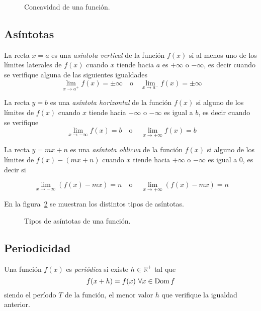 \begin{figure}[h!]
\centering {}\qquad
{}
\caption{Concavidad de una función.}
\label{g:concavidad}
\end{figure}

\subsection{Asíntotas}

La recta $x=a$ es una \emph{asíntota vertical} de la función $f(x)$ si al menos uno de los límites laterales de $f(x)$ cuando $x$ tiende hacia $a$ es $+\infty$ o $-\infty$, es decir cuando se verifique alguna de las siguientes igualdades
\[
\ \lim_{x\rightarrow a^{+}}f(x)=\pm\infty   \quad \textrm{o} \quad
\lim_{x\rightarrow a^{-}}f(x)=\pm\infty
\]

La recta $y=b$ es una \emph{asíntota horizontal} de la función $f(x)$ si alguno de los límites de $f(x)$ cuando $x$ tiende hacia $+\infty$ o $-\infty$ es igual a $b$, es decir cuando se verifique
\[
\ \lim_{x\rightarrow -\infty }f(x)=b    \quad \textrm{o} \quad
\ \lim_{x\rightarrow +\infty }f(x)=b
\]

La recta $y=mx+n$ es una \emph{asíntota oblicua} de la función $f(x)$ si alguno de los límites de $f(x)-(mx+n)$ cuando $x$ tiende hacia $+\infty$ o $-\infty$ es igual a 0, es decir si

\[
\ \lim_{x\rightarrow -\infty }{(f(x)-mx)}=n    \quad \textrm{o} \quad
\ \lim_{x\rightarrow +\infty }{(f(x)-mx)}=n
\]

En la figura~\ref{g:asintotas} se muestran los distintos tipos de asíntotas.

\begin{figure}[h!]
\centering {}\qquad\qquad
{}
\caption{Tipos de asíntotas de una función.}
\label{g:asintotas}
\end{figure}


\subsection{Periodicidad}
Una función $f(x)$ es \emph{periódica} si existe $h\in\mathbb{R^{+}}$ tal que \[f(x+h)=f(x)\  \forall x\in \mathop{\rm Dom}\nolimits f\] siendo el período $T$ de la función, el menor valor $h$ que verifique la igualdad anterior.


